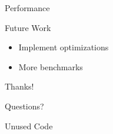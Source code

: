 \documentclass[xcolor={usenames,dvipsnames}, aspectratio=169, 12pt]{beamer}
\begin{document}
{\framelogo{\centering}
\begin{frame}{Performance}

\end{frame}}

\begin{frame}{Future Work}
\begin{itemize}
	\item Implement optimizations
	\item More benchmarks
\end{itemize}
\end{frame}

\begin{tumplainframe}{Thanks!}
\begin{center}
	\Huge Questions?
\end{center}
\end{tumplainframe}

\begin{frame}{Unused Code}
	
\end{frame}
\end{document}
